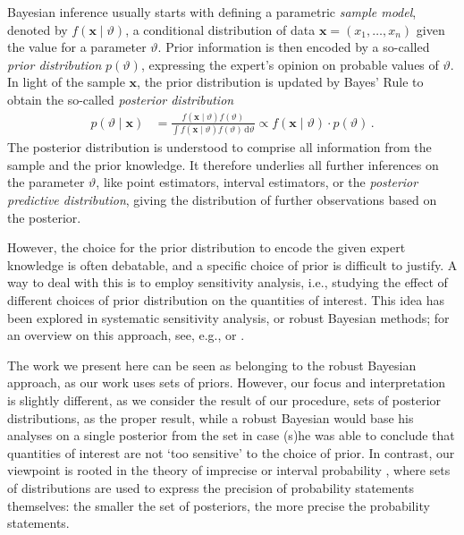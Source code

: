 \documentclass[runningheads,a4paper]{llncs}
\newcommand{\dd}{\,\mathrm{d}}
\renewcommand{\vec}[1]{{\bm #1}}
\begin{document}
Bayesian inference usually starts with defining a parametric \emph{sample model},
denoted by $f(\vec{x} \mid \vartheta)$,
a conditional distribution of data $\vec{x} = (x_1, \ldots, x_n)$ given the value for a parameter $\vartheta$.
Prior information is then encoded by a so-called \emph{prior distribution} $p(\vartheta)$,
expressing the expert's opinion on probable values of $\vartheta$.
In light of the sample $\vec{x}$, the prior distribution is updated by Bayes' Rule
to obtain the so-called \emph{posterior distribution}
\begin{align}
\label{eq:bayesrule}
p(\vartheta\mid\vec{x}) &= \frac{f(\vec{x}\mid\vartheta) f(\vartheta)}{\int f(\vec{x}\mid\vartheta) f(\vartheta) \dd \vartheta}
                         \propto f(\vec{x}\mid\vartheta) \cdot p(\vartheta)\,.
\end{align}
The posterior distribution is understood to comprise all information from the sample and the prior knowledge.
It therefore underlies all further inferences on the parameter $\vartheta$,
like point estimators, interval estimators,
or the \emph{posterior predictive distribution},
giving the distribution of further observations based on the posterior.

However, the choice for the prior distribution to encode the given expert knowledge is often debatable,
and a specific choice of prior is difficult to justify.
A way to deal with this is to employ sensitivity analysis,
i.e., studying the effect of different choices of prior distribution on the quantities of interest.
This idea has been explored in systematic sensitivity analysis, or robust Bayesian methods;
for an overview on this approach, see, e.g.,
\cite{1994:berger} or \cite{2000:rios}. %

The work we present here can be seen as belonging to the robust Bayesian approach, as our work uses sets of priors.
However, our focus and interpretation is slightly different,
as we consider the result of our procedure, sets of posterior distributions, as the proper result,
while a robust Bayesian would base his analyses on a single posterior from the set
in case (s)he was able to conclude that quantities of interest are not `too sensitive' to the choice of prior.
In contrast, our viewpoint is rooted in the theory of imprecise or interval probability \cite{itip,1991:walley},
where sets of distributions are used to express the precision of probability statements themselves:
the smaller the set of posteriors, the more precise the probability statements.
\end{document}
